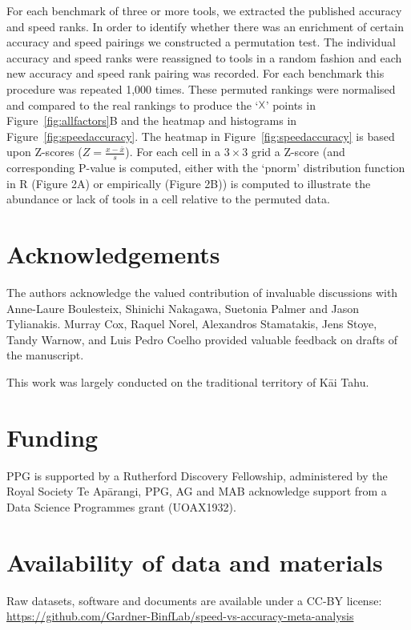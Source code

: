 \documentclass{bmcart}
\begin{document}
{For each benchmark of three or more tools, we extracted the published
accuracy and speed ranks. In order to identify whether there was an
enrichment of certain accuracy and speed pairings we constructed a
permutation test. The individual accuracy and speed ranks were
reassigned to tools in a random fashion and each new accuracy and
speed rank pairing was recorded. For each benchmark this procedure was
repeated 1,000 times. These permuted rankings were normalised and
compared to the real rankings to produce the ‘$\vartimes$’ points in
Figure~\ref{fig:allfactors}B and the heatmap and histograms in
Figure~\ref{fig:speedaccuracy}. The heatmap in
Figure~\ref{fig:speedaccuracy} is based upon Z-scores
($Z=\frac{x-\bar{x}}{s}$). For each cell in a $3\times 3$ grid
a Z-score (and corresponding P-value is computed, either with the `pnorm' distribution function in R (Figure 2A) or empirically (Figure 2B)) is computed to illustrate the abundance or lack of tools in
a cell relative to the permuted data.


\begin{backmatter}

\section*{Acknowledgements}
The authors acknowledge the valued contribution of invaluable
discussions with Anne-Laure Boulesteix, Shinichi Nakagawa, Suetonia
Palmer and Jason Tylianakis. Murray Cox, Raquel
Norel, Alexandros Stamatakis, Jens Stoye, Tandy Warnow, and 
Luis Pedro Coelho provided
valuable feedback on drafts of the manuscript.

This work was largely conducted on the traditional territory of K\=ai Tahu.

\section*{Funding}
PPG is supported by a Rutherford Discovery Fellowship,
administered by the Royal Society Te Ap\=arangi, 
PPG, AG and MAB acknowledge support from a Data Science Programmes grant
(UOAX1932).

\section*{Availability of data and materials}
Raw datasets, software and documents are available under a CC-BY license:\\
\fussy
\url{https://github.com/Gardner-BinfLab/speed-vs-accuracy-meta-analysis}
\sloppy


\end{backmatter}}
\end{document}
